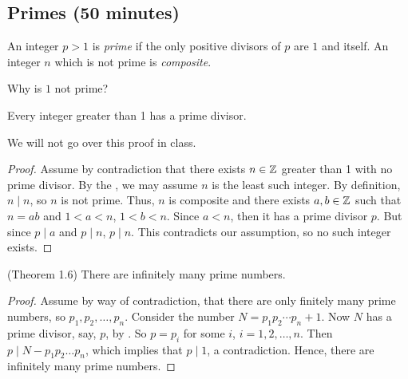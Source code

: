 \documentclass{ximera}
\begin{document}
\subsection{Primes (50 minutes)}
\begin{defn}
An integer $p>1$ is \emph{prime} if the only positive divisors of $p$ are $1$ and itself. An integer $n$ which is not prime is \emph{composite}. 
\end{defn}

Why is $1$ not prime?


\begin{lem*}[Lemma 1.5]\label{lem:prime-composite}
 Every integer greater than 1 has a prime divisor.
\end{lem*}

We will not go over this proof in class.

\begin{proof} 
 Assume by contradiction that there exists $n\in\mathbb Z$ greater than 1 with no prime divisor. By the , we may assume $n$ is the least such integer. By definition, $n\mid n$, so $n$ is not prime. Thus, $n$ is composite and there exists $a,b\in\mathbb Z$ such that $n=ab$ and $1<a<n$, $1<b<n$. Since $a<n$, then it has a prime divisor $p$. But since $p\mid a$ and $p\mid n$, $p\mid n$. This contradicts our assumption, so no such integer exists.
\end{proof}


\begin{thm*}\label{thm:inf-primes}(Theorem 1.6)
 There are infinitely many prime numbers.
\end{thm*}
\begin{proof}
 Assume by way of contradiction, that there are only finitely many prime numbers, so $p_1,p_2,\dots,p_n$. Consider the number $N=p_1p_2\cdots p_n +1$. Now $N$ has a prime divisor, say, $p$, by . So $p=p_i$ for some $i$, $i=1,2,\dots,n$. Then $p\mid N-p_1p_2\dots p_n$, which implies that $p\mid 1$, a contradiction. Hence, there are infinitely many prime numbers.
\end{proof}
\end{document}
